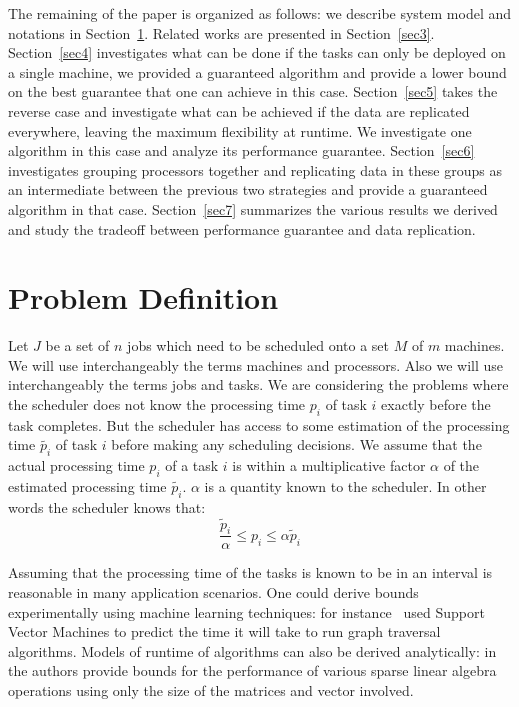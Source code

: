 \documentclass[10pt, conference, compsocconf]{IEEEtran}
\begin{document}
The remaining of the paper is organized as follows: we describe system
model and notations in Section~\ref{sec2}. Related works are presented
in Section~\ref{sec3}.  Section~\ref{sec4} investigates what can be
done if the tasks can only be deployed on a single machine, we
provided a guaranteed algorithm and provide a lower bound on the best
guarantee that one can achieve in this case. Section~\ref{sec5} takes
the reverse case and investigate what can be achieved if the data are
replicated everywhere, leaving the maximum flexibility at runtime. We
investigate one algorithm in this case and analyze its performance
guarantee. Section~\ref{sec6} investigates grouping processors
together and replicating data in these groups as an intermediate
between the previous two strategies and provide a guaranteed algorithm
in that case. Section~\ref{sec7} summarizes the various results we
derived and study the tradeoff between performance guarantee and data
replication.

\section{Problem Definition}\label{sec2}
Let $J$ be a set of $n$ jobs which need to be scheduled onto a set $M$
of $m$ machines. We will use interchangeably the terms machines and
processors. Also we will use interchangeably the terms jobs and
tasks. We are considering the problems where the scheduler does not
know the processing time $p_i$ of task $i$ exactly before the task
completes.  But the scheduler has access to some estimation of the
processing time $\tilde{p_i}$ of task $i$ before making any scheduling
decisions. We assume that the actual processing time $p_i$ of a task
$i$ is within a multiplicative factor $\alpha$ of the estimated
processing time $\tilde{p_i}$. $\alpha$ is a quantity known to the
scheduler. In other words the scheduler knows that:
 \begin{equation}\label{eq1}
\frac{\tilde{p}_{i}}{\alpha}\leq p_{i}\leq \alpha \tilde{p}_{i}
\end{equation}

Assuming that the processing time of the tasks is known to be in an
interval is reasonable in many application scenarios. One could derive
bounds experimentally using machine learning techniques: for
instance~\cite{You14-ICPP} used Support Vector Machines to predict the time it
will take to run graph traversal algorithms. Models of runtime of
algorithms can also be derived analytically:
in~\cite{Erlebacher14-ICS} the authors provide bounds for the
performance of various sparse linear algebra operations using only the
size of the matrices and vector involved.
\end{document}
